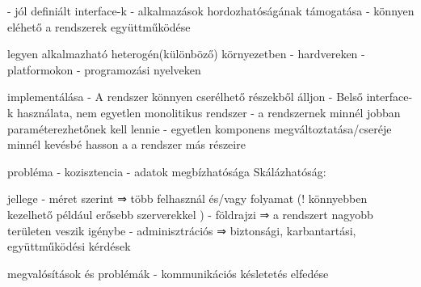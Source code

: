 \documentclass[twoside, a4paper, 12pt]{article}
\begin{document}
\begin{description}
                                                                        - jól definiált interface-k
                                                                        - alkalmazások hordozhatóságának támogatása
                                                                        - könnyen eléhető a rendszerek együttműködése
                                                                    \item legyen alkalmazható heterogén(különböző) környezetben
                                                                        - hardvereken
                                                                        - platformokon
                                                                        - programozási nyelveken
                                                                    \item implementálása
                                                                        - A rendszer könnyen cserélhető részekből álljon
                                                                        - Belső interface-k használata, nem egyetlen monolitikus rendszer
                                                                        - a rendszernek minnél jobban paraméterezhetőnek kell lennie
                                                                        - egyetlen komponens megváltoztatása/cseréje minnél kevésbé hasson a a rendszer más részeire
                                                                    \item probléma
                                                                        - kozisztencia
                                                                        - adatok megbízhatósága
                                                                        Skálázhatóság:
                                                                    \item jellege
                                                                        - méret szerint   ⇒ több felhasznál és/vagy folyamat  (! könnyebben kezelhető például erősebb szerverekkel )
                                                                        - földrajzi       ⇒ a rendszert nagyobb területen veszik igénybe
                                                                        - adminisztrációs ⇒ biztonsági, karbantartási, együttműködési kérdések
                                                                    \item megvalósítások és problémák 
                                                                        - kommunikációs késletetés elfedése 

\end{description}
\end{document}
